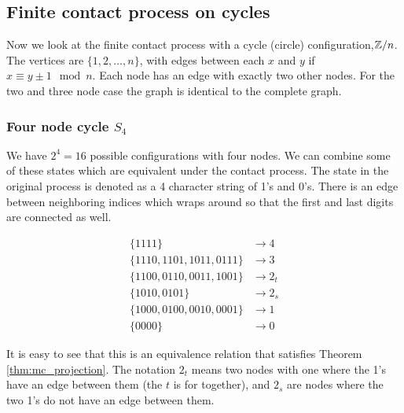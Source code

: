 \subsection{Finite contact process on cycles}

Now we look at the finite contact process with a cycle (circle) configuration,$\mathbb{Z}/n$. The vertices are $\{1, 2,\ldots, n\}$, with edges between each $x$ and $y$ if $x \equiv y \pm 1 \mod n$.
Each node has an edge with exactly two other nodes.
For the two and three node case the graph is identical to the complete graph.


\subsubsection{Four node cycle \texorpdfstring{$S_4$}{S4}}
We have $2^4 = 16$ possible configurations with four nodes.
We can combine some of these states which are equivalent under the contact process.
The state in the original process is denoted as a 4 character string of 1's and 0's.
There is an edge between neighboring indices which wraps around so that the first and last digits are connected as well.

\begin{align*}
    \{1111\} &\to 4\\
    \{1110, 1101, 1011, 0111\} &\to 3\\
    \{1100, 0110, 0011, 1001\} &\to 2_t\\
    \{1010, 0101\} &\to 2_s\\
    \{1000, 0100, 0010, 0001\} &\to 1\\
    \{0000\} &\to 0
\end{align*}

It is easy to see that this is an equivalence relation that satisfies Theorem \ref{thm:mc_projection}.
The notation $2_t$ means two nodes with one where the 1's have an edge between them (the $t$ is for together),
and $2_s$ are nodes where the two 1's do not have an edge between them.


